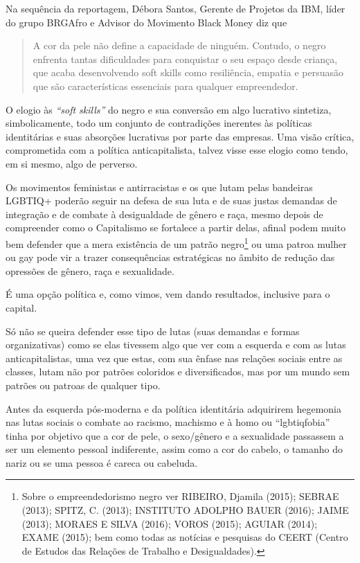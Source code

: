 Na sequência da reportagem, Débora Santos, Gerente de Projetos da IBM,
líder do grupo BRGAfro e Advisor do Movimento Black Money diz que

\begin{quote}
A cor da pele não define a capacidade de ninguém. Contudo, o negro
enfrenta tantas dificuldades para conquistar o seu espaço desde criança,
que acaba desenvolvendo soft skills como resiliência, empatia e
persuasão que são características essenciais para qualquer empreendedor.
\end{quote}

O elogio às \emph{``soft skills''} do negro e sua conversão em algo
lucrativo sintetiza, simbolicamente, todo um conjunto de contradições
inerentes às políticas identitárias e suas absorções lucrativas por
parte das empresas. Uma visão crítica, comprometida com a política
anticapitalista, talvez visse esse elogio como tendo, em si mesmo, algo
de perverso.

Os movimentos feministas e antirracistas e os que lutam pelas bandeiras
LGBTIQ+ poderão seguir na defesa de sua luta e de suas justas demandas
de integração e de combate à desigualdade de gênero e raça, mesmo depois
de compreender como o Capitalismo se fortalece a partir delas, afinal
podem muito bem defender que a mera existência de um patrão
negro\footnote{Sobre o empreendedorismo negro ver RIBEIRO, Djamila
  (2015); SEBRAE (2013); SPITZ, C. (2013); INSTITUTO ADOLPHO BAUER
  (2016); JAIME (2013); MORAES E SILVA (2016); VOROS (2015); AGUIAR
  (2014); EXAME (2015); bem como todas as notícias e pesquisas do CEERT
  (Centro de Estudos das Relações de Trabalho e Desigualdades).} ou uma
patroa mulher ou gay pode vir a trazer consequências estratégicas no
âmbito de redução das opressões de gênero, raça e sexualidade.

É uma opção política e, como vimos, vem dando resultados, inclusive para
o capital.

Só não se queira defender esse tipo de lutas (suas demandas e formas
organizativas) como se elas tivessem algo que ver com a esquerda e com
as lutas anticapitalistas, uma vez que estas, com sua ênfase nas
relações sociais entre as classes, lutam não por patrões coloridos e
diversificados, mas por um mundo sem patrões ou patroas de qualquer
tipo.

Antes da esquerda pós-moderna e da política identitária adquirirem
hegemonia nas lutas sociais o combate ao racismo, machismo e à homo ou
``lgbtiqfobia'' tinha por objetivo que a cor de pele, o sexo/gênero e a
sexualidade passassem a ser um elemento pessoal indiferente, assim como
a cor do cabelo, o tamanho do nariz ou se uma pessoa é careca ou
cabeluda.

